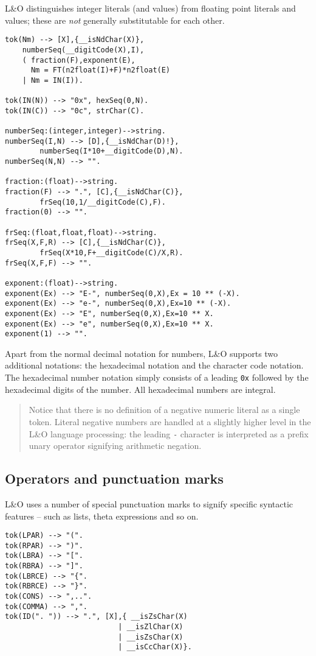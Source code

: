 L&O distinguishes integer literals (and values) from floating point literals and values; these are \emph{not} generally substitutable for each other.

\begin{verbatim}
tok(Nm) --> [X],{__isNdChar(X)},
    numberSeq(__digitCode(X),I),
    ( fraction(F),exponent(E),
      Nm = FT(n2float(I)+F)*n2float(E)
    | Nm = IN(I)).

tok(IN(N)) --> "0x", hexSeq(0,N).
tok(IN(C)) --> "0c", strChar(C).

numberSeq:(integer,integer)-->string.
numberSeq(I,N) --> [D],{__isNdChar(D)!},
        numberSeq(I*10+__digitCode(D),N).
numberSeq(N,N) --> "".

fraction:(float)-->string.
fraction(F) --> ".", [C],{__isNdChar(C)},
        frSeq(10,1/__digitCode(C),F).
fraction(0) --> "".

frSeq:(float,float,float)-->string.
frSeq(X,F,R) --> [C],{__isNdChar(C)},
        frSeq(X*10,F+__digitCode(C)/X,R).
frSeq(X,F,F) --> "".

exponent:(float)-->string.
exponent(Ex) --> "E-", numberSeq(0,X),Ex = 10 ** (-X).
exponent(Ex) --> "e-", numberSeq(0,X),Ex=10 ** (-X).
exponent(Ex) --> "E", numberSeq(0,X),Ex=10 ** X.
exponent(Ex) --> "e", numberSeq(0,X),Ex=10 ** X.
exponent(1) --> "".
\end{verbatim}
Apart from the normal decimal notation for numbers, L&O supports two additional notations: the hexadecimal notation and the character code notation. The hexadecimal number notation simply consists of a leading \verb+0x+ followed by the hexadecimal digits of the number. All hexadecimal numbers are integral.

\begin{quote}
Notice that there is no definition of a negative numeric literal as a single token. Literal negative numbers are handled at a slightly higher level in the L&O language processing: the leading \verb+-+ character is interpreted as a prefix unary operator signifying arithmetic negation.
\end{quote}

\subsection{Operators and punctuation marks}

L&O uses a number of special punctuation marks to signify specific syntactic features -- such as lists, theta expressions and so on.
\begin{verbatim}
tok(LPAR) --> "(".
tok(RPAR) --> ")".
tok(LBRA) --> "[".
tok(RBRA) --> "]".
tok(LBRCE) --> "{".
tok(RBRCE) --> "}".
tok(CONS) --> ",..".
tok(COMMA) --> ",".
tok(ID(". ")) --> ".", [X],{ __isZsChar(X)
                          | __isZlChar(X)
                          | __isZsChar(X)
                          | __isCcChar(X)}.
\end{verbatim}

